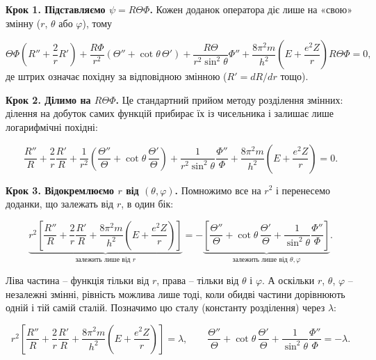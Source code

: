 \documentclass{article}
\begin{document}
\begin{tcolorbox}[vintagebox, title={\upshape\rule{4mm}{0.3pt}~~Детально: як саме відбувається розщеплення~~\rule{4mm}{0.3pt}}]

\textbf{Крок 1. Підставляємо $\psi = R\Theta\Phi$.}
Кожен доданок оператора діє лише на «свою» змінну ($r$, $\theta$ або $\varphi$), тому

\begin{equation*}
\Theta\Phi\left(R'' + \frac{2}{r}R'\right)
+ \frac{R\Phi}{r^2}\left(\Theta'' + \cot\theta\,\Theta'\right)
+ \frac{R\Theta}{r^2\sin^2\theta}\Phi''
+ \frac{8\pi^2 m}{h^2}\!\left(E+\frac{e^2Z}{r}\right)\! R\Theta\Phi = 0,
\end{equation*}
де штрих означає похідну за відповідною змінною ($R'=dR/dr$ тощо).

\textbf{Крок 2. Ділимо на $R\Theta\Phi$.}
Це стандартний прийом методу розділення змінних: ділення на добуток самих функцій прибирає їх із чисельника і залишає лише логарифмічні похідні:

\begin{equation*}
\frac{R''}{R} + \frac{2}{r}\frac{R'}{R}
+ \frac{1}{r^2}\left(\frac{\Theta''}{\Theta} + \cot\theta\,\frac{\Theta'}{\Theta}\right)
+ \frac{1}{r^2\sin^2\theta}\frac{\Phi''}{\Phi}
+ \frac{8\pi^2 m}{h^2}\!\left(E+\frac{e^2Z}{r}\right) = 0.
\end{equation*}

\textbf{Крок 3. Відокремлюємо $r$ від $(\theta,\varphi)$.}
Помножимо все на $r^2$ і перенесемо доданки, що залежать від $r$, в один бік:

\begin{equation*}
\underbrace{r^2\left[\frac{R''}{R} + \frac{2}{r}\frac{R'}{R} + \frac{8\pi^2 m}{h^2}\!\left(E+\frac{e^2Z}{r}\right)\right]}_{\text{залежить лише від } r}
= -\underbrace{\left[\frac{\Theta''}{\Theta} + \cot\theta\,\frac{\Theta'}{\Theta} + \frac{1}{\sin^2\theta}\frac{\Phi''}{\Phi}\right]}_{\text{залежить лише від } \theta,\varphi}.
\end{equation*}

Ліва частина -- функція тільки від $r$, права -- тільки від $\theta$ і $\varphi$. А оскільки $r$, $\theta$, $\varphi$ -- незалежні змінні, рівність можлива лише тоді, коли обидві частини дорівнюють одній і тій самій сталій. Позначимо цю сталу (константу розділення) через $\lambda$:

\begin{equation*}
r^2\left[\frac{R''}{R} + \frac{2}{r}\frac{R'}{R} + \frac{8\pi^2 m}{h^2}\!\left(E+\frac{e^2Z}{r}\right)\right] = \lambda,
\qquad
\frac{\Theta''}{\Theta} + \cot\theta\,\frac{\Theta'}{\Theta} + \frac{1}{\sin^2\theta}\frac{\Phi''}{\Phi} = -\lambda .
\end{equation*}


\end{tcolorbox}
\end{document}
